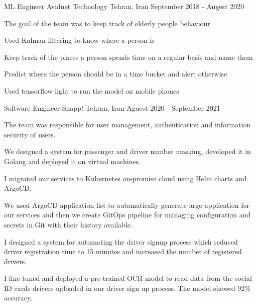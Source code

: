 
\begin{cventries}

  \cventry
    {ML Engineer} %
    {Avidnet Technology} %
    {Tehran, Iran} %
    {September 2018 - Augest 2020} %
    {
      \begin{cvitems}
        \item The goal of the team was to keep track of elderly people behaviour 
        \item Used Kalman filtering to know where a person is
        \item Keep track of the places a person spends time on a regular basis and name them
        \item Predict where the person should be in a time bucket and alert otherwise
        \item Used tensorflow light to run the model on mobile phones
      \end{cvitems}
    }

  \cventry
    {Software Engineer} %
    {Snapp!} %
    {Tehran, Iran} %
    {Aguest 2020 - September 2021} %
    {
      \begin{cvitems} %
        \item The team was responsible for user management, authentication and information security of users.
        \item We designed a system for passenger and driver number masking, developed it in Golang and deployed it on virtual machines.
        \item I migrated our services to Kubernetes on‐promise cloud using Helm charts and ArgoCD.
        \item We used ArgoCD application list to automatically generate argo application for our services and then we create GitOps pipeline for managing configuration and secrets in Git with their history available.
        \item I designed a system for automating the driver signup process which reduced driver registration time to 15 minutes and increased the number of registered drivers.
        \item I fine tuned and deployed a pre-trained OCR model to read data from the social ID cards drivers uploaded in our driver sign up process. The model showed 92\% accuracy.
      \end{cvitems}
    }


\end{cventries}
